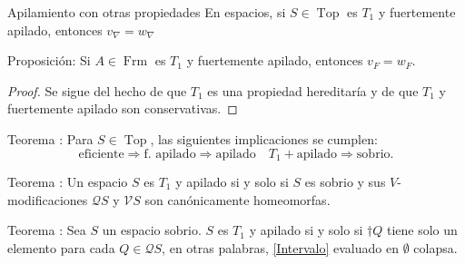 \documentclass[compress,12pt]{beamer}
\DeclareMathOperator{\Frm}{Frm}
\DeclareMathOperator{\Top}{Top}
\begin{document}
\begin{frame}{Apilamiento con otras propiedades}
En espacios, si $S\in \Top$ es $T_1$ y fuertemente apilado, entonces $v_\nabla=w_\nabla$

\begin{block}{Proposición:}
Si $A\in \Frm$ es $T_1$ y fuertemente apilado, entonces $v_F=w_F$.
\end{block}

\begin{proof}
Se sigue del hecho de que $T_1$  es una propiedad hereditaría y de que $T_1$ y fuertemente apilado son conservativas. 
\end{proof}
\end{frame}

\begin{frame}
\begin{block}{Teorema \citep[6.2]{sexton2006ordinal}:}
  Para $S\in \Top$, las siguientes implicaciones se cumplen:
    \[
      \text{eficiente}\Rightarrow \text{f. apilado}\Rightarrow \text{apilado}\quad T_1+\text{apilado}\Rightarrow \text{sobrio}.
    \]
\end{block}

\begin{block}{Teorema \citep[7.4]{sexton2006ordinal}:}
Un espacio $S$ es $T_1$ y apilado si y solo si $S$ es sobrio y sus $V$-modificaciones $\mathcal{Q}S$ y $\mathcal{V}S$ son canónicamente homeomorfas.
\end{block}

\begin{block}{Teorema \citep[7.11]{simmons2004vietoris}:}
Sea $S$ un espacio sobrio. $S$ es $T_1$ y apilado si y solo si $\dagger Q$ tiene solo un elemento para cada $Q\in \mathcal{Q}S$, en otras palabras, \eqref{Intervalo} evaluado en $\emptyset$ colapsa.
\end{block}
\end{frame}
\end{document}
